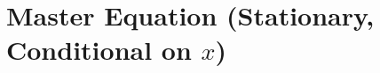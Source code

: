 \documentclass[11pt,letterpaper,oneside]{article}
\numberwithin{equation}{section}
\newcommand{\ac}[1]{\textsc{#1}}
\newcommand{\1}{\mathbf{1}}
\newcommand{\diff}{,\mathrm{d}}
\newcommand{\Lz}{L\_z}
\newcommand{\Lx}{L\_x}
\newcommand{\dmU}{\delta\_m U}
\begin{document}
\section{Master Equation (Stationary, Conditional on $x$)}
\begin{comment}
Define the master value $U(k,z,x,m)$ and the Lions derivative $\dmU(\xi;k,z,x,m)$ at $\xi=(\kappa,\zeta)$. The drift at $\xi$ is

$$
b(\xi,x,m)=(i^*(\xi,x,m)-\delta\kappa)\,e_k+\mu_z(\zeta)\,e_z,
$$

and diffusion is only in $z$ with variance $\sigma_z^2$. The stationary master equation reads
\begin{equation}
\boxed{
\begin{aligned}
r(x),U(k,z,x,m)=\ &\max\_{i}\big{\pi(k,i,z,x,m)+U\_k(i-\delta k)+\Lz U+\Lx U\big}\\
&\ +\int\Big\[(i^\*(\xi,x,m)-\delta\kappa),\partial\_\kappa\dmU
+\mu\_z(\zeta),\partial\_\zeta\dmU
+\tfrac12\sigma\_z^2,\partial\_{\zeta\zeta}^2\dmU\Big], m(\diff \xi)\\
&\ +\underbrace{\int \delta\_m \pi(\xi;,k,z,x,m), m(\diff \xi)}\_{\text{direct price externality}}.
\end{aligned}}
\tag{ME}\label{eq\:ME}
\end{equation}

\begin{proposition}\[Price-externality simplification]\label{prop\:externality}
Since $\pi$ depends on $m$ only through $Y$,

$$
\delta_m \pi(\xi;\,k,z,x,m)= P'(Y)\,\underbrace{e^{x+z}k^\alpha}_{\text{this firm}}\ \underbrace{e^{x+\zeta}\kappa^\alpha}_{\text{marginal firm}},
$$

hence

$$
\int \delta_m \pi(\xi;\,k,z,x,m)\, m(\diff \xi)
= e^{x+z}k^\alpha\,Y(m,x)\,P'(Y(m,x)).
$$

If $P(Y)=Y^{-\eta}$, then by \eqref{eq\:isoelastic} the term equals $-\eta\,P(Y)\,e^{x+z}k^\alpha$.
\end{proposition}

\begin{proof}\[Sketch]
Apply \Cref{lem\:chain} with $\varphi(\xi)=e^{x+\zeta}\kappa^\alpha$. The derivative of $m\mapsto P(Y(m,x))$ is $P'(Y)\varphi(\xi)$. Multiplying by the firm-specific factor $e^{x+z}k^\alpha$ and integrating over $\xi$ gives the stated expression.
\end{proof}

\begin{theorem}\[Equivalence (sketch)]\label{thm\:equivalence}
Under \Cref{ass\:primitives,ass\:regularity} and standard monotonicity/regularity hypotheses (Lasry--Lions), stationary solutions of the coupled \ac{HJB}--\ac{FP} fixed point coincide with stationary solutions of \eqref{eq\:ME} conditional on $x$.
\end{theorem}


\end{comment}
\end{document}
